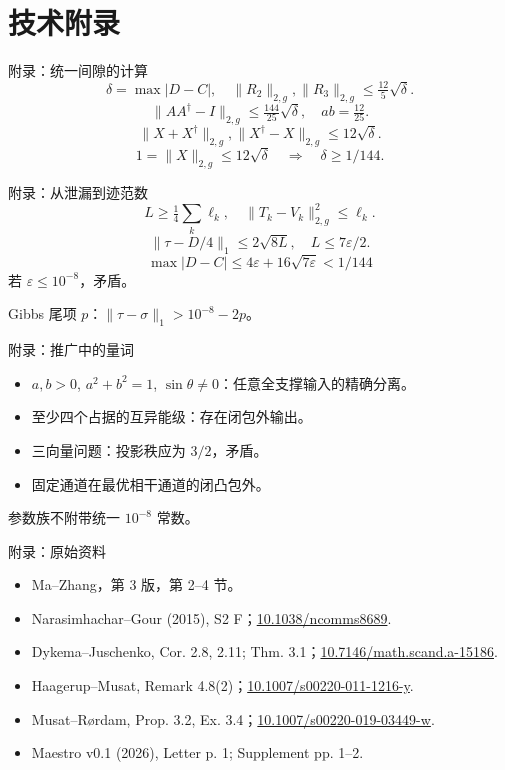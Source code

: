 \documentclass{beamer}
\begin{document}
\section{技术附录}
\begin{frame}{附录：统一间隙的计算}
\[\delta=\max|D-C|,\quad\|R_2\|_{2,g},\|R_3\|_{2,g}\leq\tfrac{12}{5}\sqrt\delta.\]
 \[\|AA^\dagger-I\|_{2,g}\leq\tfrac{144}{25}\sqrt\delta,\quad ab=\tfrac{12}{25}.\]
 \[\|X+X^\dagger\|_{2,g},\|X^\dagger-X\|_{2,g}\leq12\sqrt\delta.\]
 \[1=\|X\|_{2,g}\leq12\sqrt\delta\quad\Longrightarrow\quad\delta\geq1/144.\]
\end{frame}
\begin{frame}{附录：从泄漏到迹范数}
\[L\geq\tfrac14\sum_k\ell_k,\quad\|T_k-V_k\|_{2,g}^2\leq\ell_k.\]
 \[\|\tau-D/4\|_1\leq2\sqrt{8L},\quad L\leq7\varepsilon/2.\]
 \[\max|D-C|\leq4\varepsilon+16\sqrt{7\varepsilon}<1/144\]
 若 $\varepsilon\leq10^{-8}$，矛盾。

 Gibbs 尾项 $p$：$\|\tau-\sigma\|_1>10^{-8}-2p$。
\end{frame}
\begin{frame}{附录：推广中的量词}
\begin{itemize}
 \item $a,b>0$, $a^2+b^2=1$, $\sin\theta\ne0$：任意全支撑输入的精确分离。
 \item 至少四个占据的互异能级：存在闭包外输出。
 \item 三向量问题：投影秩应为 $3/2$，矛盾。
 \item 固定通道在最优相干通道的闭凸包外。
 \end{itemize}
 参数族不附带统一 $10^{-8}$ 常数。
\end{frame}
\begin{frame}{附录：原始资料}
\small
 \begin{itemize}
 \item Ma--Zhang，第 3 版，第 2--4 节。
 \item Narasimhachar--Gour (2015), S2 F；\href{https://doi.org/10.1038/ncomms8689}{10.1038/ncomms8689}.
 \item Dykema--Juschenko, Cor. 2.8, 2.11; Thm. 3.1；\href{https://doi.org/10.7146/math.scand.a-15186}{10.7146/math.scand.a-15186}.
 \item Haagerup--Musat, Remark 4.8(2)；\href{https://doi.org/10.1007/s00220-011-1216-y}{10.1007/s00220-011-1216-y}.
 \item Musat--Rørdam, Prop. 3.2, Ex. 3.4；\href{https://doi.org/10.1007/s00220-019-03449-w}{10.1007/s00220-019-03449-w}.
 \item Maestro v0.1 (2026), Letter p. 1; Supplement pp. 1--2.
 \end{itemize}
\end{frame}
\FormalVerification
\end{document}
